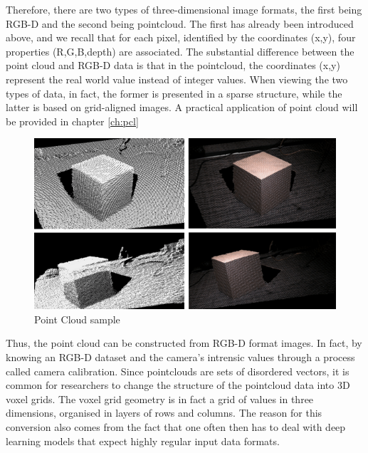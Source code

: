 Therefore, there are two types of three-dimensional image formats, the first being RGB-D and the second being pointcloud.
The first has already been introduced above, and we recall that for each pixel, identified by the coordinates (x,y), four properties (R,G,B,depth) are associated.
The substantial difference between the point cloud and RGB-D data is that in the pointcloud, the coordinates (x,y) represent the real world value instead of integer values. When viewing the two types of data, in fact, the former is presented in a sparse structure, while the latter is based on grid-aligned images. 
A practical application of point cloud will be provided in chapter \ref{ch:pcl}
\begin{figure}[H]
    \centering
    \includegraphics[scale=0.4]{Images/Chapter 3/pointcloudsample.png}
    \caption{Point Cloud sample}
    \label{fig:pointcloudsample}
\end{figure}
Thus, the point cloud can be constructed from RGB-D format images. In fact, by knowing an RGB-D dataset and the camera's intrensic values through a process called camera calibration. 
Since pointclouds are sets of disordered vectors, it is common for researchers to change the structure of the pointcloud data into 3D voxel grids.
The voxel grid geometry is in fact a grid of values in three dimensions, organised in layers of rows and columns.
The reason for this conversion also comes from the fact that one often then has to deal with deep learning models that expect highly regular input data formats.
